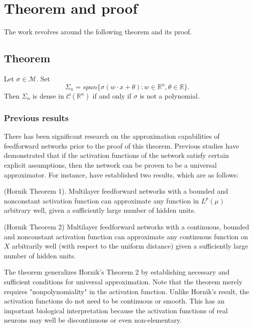 \documentclass[../main.tex]{subfiles}
\begin{document}
	\chapter{Theorem and proof} \label{ch:proof}
\noindent  The work revolves around the following theorem and its proof. 
	\section{Theorem}
	\begin{theorem} Let $ \sigma \in  \mathcal{M}$. Set
		$$ \Sigma_n = span\{\sigma(w\cdot x + \theta) : w\in \mathbb{R}^n, \theta \in \mathbb{R} \}.$$
		Then $\Sigma_n$ is dense in $\mathcal{C}(\mathbb{R}^n)$ if and only if $\sigma$ is not a polynomial. 
	
	\end{theorem}


\subsection{Previous results}
\noindent  There has been significant research on the approximation capabilities of feedforward networks prior to the proof of this theorem. Previous studies have demonstrated that if the activation functions of the network satisfy certain explicit assumptions, then the network can be proven to be a universal approximator. For instance, \cite{HORNIK1991251} have established two results, which are as follows:

\begin{theorem} (Hornik Theorem 1). Multilayer feedforward networks with a bounded and nonconstant activation function can approximate any function in $L^p(\mu)$ arbitrary well, given a sufficiently large number of hidden units. 
\end{theorem}

\begin{theorem} (Hornik Theorem 2) Multilayer feedforward networks with a continuous, bounded and nonconstant activation function can approximate any continuous function on $X$ arbitrarily well (with respect to the uniform distance) given a sufficiently large number of hidden units. 
\end{theorem}

\noindent
The theorem generalizes Hornik's Theorem 2 by establishing necessary and sufficient conditions for universal approximation. Note that the theorem merely requires "nonpolynomiality" in the activation function. Unlike Hornik's result, the activation functions do not need to be continuous or smooth. This has an important biological interpretation because the activation functions of real neurons may well be discontinuous or even non-elementary.
\end{document}
